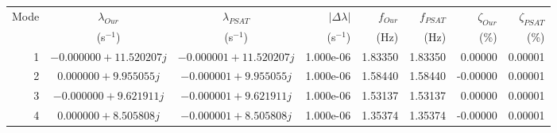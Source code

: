 \begin{tabular}{r cc r rr rr}\toprule
Mode & {$\lambda_{Our}$} & {$\lambda_{PSAT}$} & {$|\Delta\lambda|$} & {$f_{Our}$} & {$f_{PSAT}$} & {$\zeta_{Our}$} & {$\zeta_{PSAT}$} \\ 
{} & {(s$^{-1}$)} & {(s$^{-1}$)} & {(s$^{-1}$)} & {(Hz)} & {(Hz)} & {(\%)} & {(\%)} \\ \midrule
1 & {$-0.000000+11.520207j$} & {$-0.000001+11.520207j$} & 1.000e-06 & 1.83350 & 1.83350 & 0.00000 & 0.00001 \\
2 & {$0.000000+9.955055j$} & {$-0.000001+9.955055j$} & 1.000e-06 & 1.58440 & 1.58440 & -0.00000 & 0.00001 \\
3 & {$-0.000000+9.621911j$} & {$-0.000001+9.621911j$} & 1.000e-06 & 1.53137 & 1.53137 & 0.00000 & 0.00001 \\
4 & {$0.000000+8.505808j$} & {$-0.000001+8.505808j$} & 1.000e-06 & 1.35374 & 1.35374 & -0.00000 & 0.00001 \\
\bottomrule\end{tabular}
